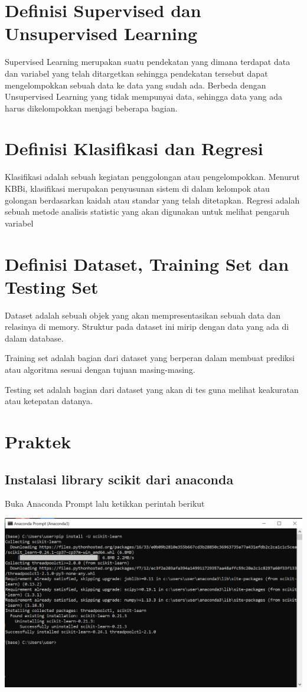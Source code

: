 \documentclass{homework}
\begin{document}
\section{Definisi Supervised dan Unsupervised Learning}
Supervised Learning merupakan suatu pendekatan yang dimana terdapat data dan variabel yang telah ditargetkan sehingga pendekatan tersebut dapat mengelompokkan sebuah data ke data yang sudah ada. Berbeda dengan Unsupervised Learning yang tidak mempunyai data, sehingga data yang ada harus dikelompokkan menjagi beberapa bagian.

\section{Definisi Klasifikasi dan Regresi}
Klasifikasi adalah sebuah kegiatan penggolongan atau pengelompokkan. Menurut KBBi, klasifikasi merupakan penyusunan sistem di dalam kelompok atau golongan berdasarkan kaidah atau standar yang telah ditetapkan. 
Regresi adalah sebuah metode analisis statistic yang akan digunakan untuk melihat pengaruh variabel

\section{Definisi Dataset, Training Set dan Testing Set}
Dataset adalah sebuah objek yang akan mempresentasikan sebuah data dan relasinya di memory. Struktur pada dataset ini mirip dengan data yang ada di dalam database. 

Training set adalah bagian dari dataset yang berperan dalam membuat prediksi atau algoritma sesuai dengan tujuan masing-masing.

Testing set adalah bagian dari dataset yang akan di tes guna melihat keakuratan atau ketepatan datanya.

\section{Praktek}
\subsection{Instalasi library scikit dari anaconda}
Buka Anaconda Prompt lalu ketikkan perintah berikut
\begin{center}
    \includegraphics[width=.8\textwidth]{Pict/1.PNG}
\end{center}
    
\end{document}
